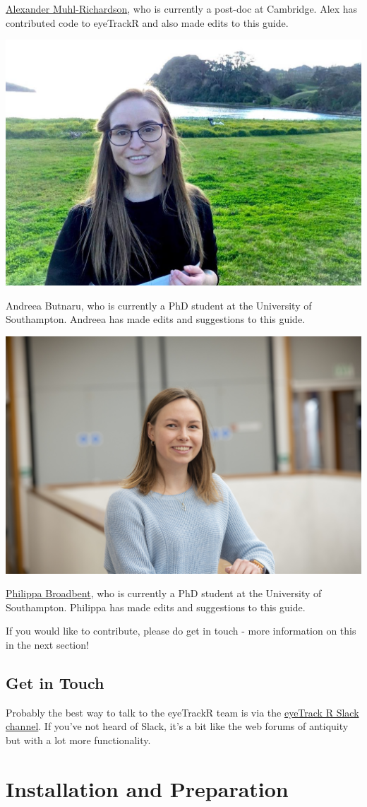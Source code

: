 \documentclass[]{book}
\begin{document}
\href{https://twitter.com/alexmuhl_r}{Alexander Muhl-Richardson}, who is currently a post-doc at Cambridge. Alex has contributed code to eyeTrackR and also made edits to this guide.

\includegraphics[width=0.5\linewidth]{files/images/andreea}

Andreea Butnaru, who is currently a PhD student at the University of Southampton. Andreea has made edits and suggestions to this guide.

\includegraphics[width=0.5\linewidth]{files/images/philippa}

\href{https://twitter.com/phillybroadbent}{Philippa Broadbent}, who is currently a PhD student at the University of Southampton. Philippa has made edits and suggestions to this guide.

If you would like to contribute, please do get in touch - more information on this in the next section!

\hypertarget{get-in-touch}{%
\section{Get in Touch}\label{get-in-touch}}

Probably the best way to talk to the eyeTrackR team is via the \href{https://join.slack.com/t/eyetrackr/shared_invite/enQtODQyNDQzMzkxNTc1LWM4MmUyMTJmYTA4ZjgzNWNjNGQxNzcxYWY1NWNhYzM2ODg1OWNiNDg4MzIxYWZmZjkwZWFjMTU0MmU4NDE5Y2Y}{eyeTrack R Slack channel}. If you've not heard of Slack, it's a bit like the web forums of antiquity but with a lot more functionality.

\hypertarget{installation}{%
\chapter{Installation and Preparation}\label{installation}}
\end{document}
